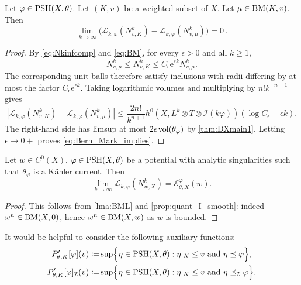 \begin{lemma}\label{lma:BML}
Let $\varphi\in \mathrm{PSH}(X,\theta)$.
Let $(K,v)$ be a weighted subset of $X$. Let $\mu\in \mathrm{BM}(K,v)$. Then
\begin{equation}\label{eq:Bern_Mark_implies}
\lim_{k\to\infty} \big( \mathcal{L}_{k,\varphi}(N^k_{v,K}) - \mathcal{L}_{k,\varphi}(N^k_{v,\mu})\big) = 0\,.
\end{equation}
\end{lemma}
\begin{proof}
By \eqref{eq:Nkinfcomp} and \eqref{eq:BM}, for every $\epsilon>0$ and all $k\geq 1$,
\[
N^k_{v,\mu}\leq N^k_{v,K}\leq C_\epsilon \mathrm{e}^{\epsilon k}N^k_{v,\mu}.
\]
The corresponding unit balls therefore satisfy inclusions with radii differing by at most the factor $C_\epsilon \mathrm{e}^{\epsilon k}$. Taking logarithmic volumes and multiplying by $n!k^{-n-1}$ gives
\[
\left|\mathcal{L}_{k,\varphi}(N^k_{v,K})-\mathcal{L}_{k,\varphi}(N^k_{v,\mu})\right|
\leq \frac{2n!}{k^{n+1}} h^0\left(X,L^k\otimes T\otimes \mathcal{I}(k\varphi)\right)(\log C_\epsilon+\epsilon k).
\]
The right-hand side has limsup at most $2\epsilon\operatorname{vol}(\theta_\varphi)$ by \cref{thm:DXmain1}. Letting $\epsilon\to 0+$ proves \eqref{eq:Bern_Mark_implies}.
\end{proof}



\begin{corollary}\label{cor:Ninfdifflim}
Let $w \in C^0(X)$, $\varphi \in \mathrm{PSH}(X,\theta)$ be a potential with analytic singularities such that $\theta_\varphi$ is a Kähler current. Then
\[
\lim_{k\to\infty}\mathcal{L}_{k,\varphi}(N^k_{w,X})=\mathcal{E}_{\theta,X}^{\varphi}(w).
\]
\end{corollary}
\begin{proof}
This follows from \cref{lma:BML} and \cref{prop:quant_I_smooth}: indeed $\omega^n \in \mathrm{BM}(X,0)$, hence $\omega^n\in \mathrm{BM}(X,w)$ as $w$ is bounded.
\end{proof}


It would be helpful to consider the following auxiliary functions:
\[
\begin{aligned}
    P'_{\theta,K}[\varphi](v)\coloneqq & \sup \Bigl\{ \eta \in \mathrm{PSH}(X,\theta): \eta|_K \leq v  \textup{ and } \eta\preceq \varphi\Bigr\},\\
    P'_{\theta,K}[\varphi]_{\mathcal{I}}(v)\coloneqq & \sup \Bigl\{ \eta \in \mathrm{PSH}(X,\theta): \eta|_K \leq v  \textup{ and } \eta\preceq_{\mathcal{I}} \varphi\Bigr\}.
\end{aligned}
\]

